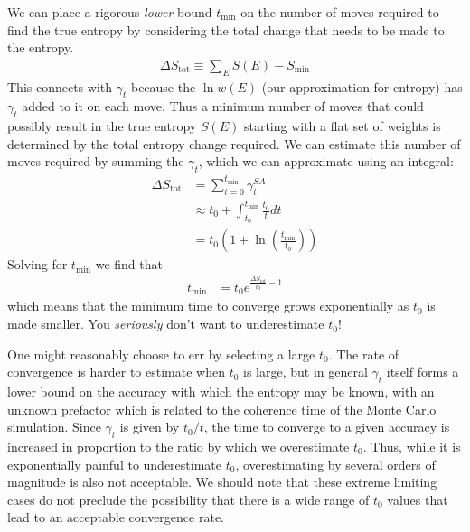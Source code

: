 \documentclass[letterpaper,twocolumn,amsmath,amssymb,pre,aps,10pt]{revtex4-1}
\begin{document}
We can place a rigorous \emph{lower} bound $t_{\min}$ on the number of
moves required to find the true entropy by considering the total change
that needs to be made to the entropy.
\begin{align}
  \Delta S_{\text{tot}} \equiv \sum_E S(E) - S_{\min}
\end{align}
This connects with $\gamma_t$ because the $\ln w(E)$ (our approximation for entropy)
has $\gamma_t$ added to it on each move.  Thus a minimum number of moves
that could possibly result in the true entropy $S(E)$ starting with a flat set of
weights is determined by the total entropy change required.  We can estimate
this number of moves required by summing the $\gamma_t$,
which we can approximate using an integral:
\begin{align}
   \Delta S_{\text{tot}} &= \sum_{t=0}^{t_{\min}} \gamma_t^{SA} \\
  &\approx t_0 + \int_{t_0}^{t_{\min}} \frac{t_0}{t}dt
  \\
  &= t_0\left(1 + \ln\left(\frac{t_{\min}}{t_0}\right)\right)
\end{align}
Solving for ${t_{\min}}$ we find that
\begin{align}
  {t_{\min}} &= t_0 e^{\frac{\Delta S_{\text{tot}}}{t_0} - 1}
\end{align}
which means that the minimum time to converge grows exponentially
as $t_0$ is made smaller.  You \emph{seriously} don't want to underestimate
$t_0$!

One might reasonably choose to err by selecting a large $t_0$.
The rate of convergence is harder to estimate when $t_0$ is large, but
in general $\gamma_t$ itself forms a lower bound on the accuracy with which
the entropy may be known, with an unknown prefactor which is related to
the coherence time of the Monte Carlo simulation.  Since $\gamma_t$ is
given by $t_0/t$, the time to converge to a given accuracy is increased
in proportion to the ratio by which we overestimate $t_0$.  Thus, while
it is exponentially painful to underestimate $t_0$, overestimating by
several orders of magnitude is also not acceptable.  We should note
that these extreme limiting cases do not preclude the possibility that there
is a wide range of $t_0$ values that lead to an acceptable convergence
rate.
\end{document}
